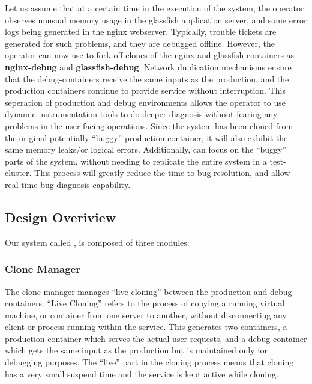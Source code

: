 Let us assume that at a certain time in the execution of the system, the operator observes unusual memory usage in the glassfish application server, and some error logs being generated in the nginx webserver. 
Typically, trouble tickets are generated for such problems, and they are debugged offline.
However, the operator can now use \parikshan to fork off clones of the nginx and glassfish containers as \textbf{nginx-debug} and \textbf{glassfish-debug}.
Network duplication mechanisms ensure that the debug-containers receive the same inputs as the production, and the production containers continue to provide service without interruption.
This seperation of production and debug environments allows the operator to use dynamic instrumentation tools to do deeper diagnosis without fearing any problems in the user-facing operations.
Since the system has been cloned from the original potentially ``buggy'' production container, it will also exhibit the same memory leaks/or logical errors.
Additionally, \parikshan can focus on the ``buggy'' parts of the system, without needing to replicate the entire system in a test-cluster. This process will greatly reduce the time to bug resolution, and allow real-time bug diagnosis capability.

\subsection{Design Overiview}
\label{sec:design}

Our system called \parikshan, is composed of three modules:\\


\noindent \subsubsection{Clone Manager}
The clone-manager manages ``live cloning'' between the production and debug containers.
``Live Cloning'' refers to the process of copying a running virtual machine, or container from one server to another, without disconnecting any client or process running within the service.
This generates two containers, a production container which serves the actual user requests, and a debug-container which gets the same input as the production but is maintained only for debugging purposes.
The ``live'' part in the cloning process means that cloning has a very small suspend time and the service is kept active while cloning. \\

